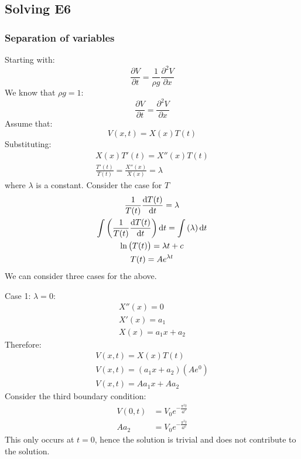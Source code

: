 \documentclass[11pt]{article}
\numberwithin{equation}{section}
\begin{document}
\subsection{Solving E6}
\subsubsection{Separation of variables}
Starting with:
\begin{equation}
    \frac{\partial V}{\partial t} = \frac{1}{\rho g }\frac{\partial^2 V}{\partial x}
\end{equation}
We know that $\rho g = 1$:
\begin{equation}
    \frac{\partial V}{\partial t} = \frac{\partial^2 V}{\partial x}
\end{equation}
Assume that:
\begin{equation}
    V(x,t) = X(x)T(t)
\end{equation}
Substituting:
\begin{gather}
    X(x)T'(t) = X''(x)T(t)\\
    \frac{T'(t)}{T(t)} = \frac{X''(x)}{X(x)} = \lambda
\end{gather}
where $\lambda$ is a constant. Consider the case for $T$
\begin{gather}
    \frac{1}{T(t)}\frac{\dif T(t)}{\dif t} = \lambda\\
    \int \left(\frac{1}{T(t)}\frac{\dif T(t)}{\dif t}\right) \dif t = \int \left(\lambda \right) \dif t\\
    \ln\left(T(t)\right) = \lambda t + c\\
    T(t) = Ae^{\lambda t}
\end{gather}
We can consider three cases for the above. 

Case 1: $\lambda = 0$:
\begin{gather}
    X''(x) = 0\\
    X'(x) = a_1\\
    X(x) = a_1 x + a_2
\end{gather}
Therefore:
\begin{gather}
    V(x,t) = X(x)T(t)\\
    V(x,t) = \left(a_1 x + a_2\right)\left(Ae^0\right)\\
    V(x,t) = A a_1 x + Aa_2 
\end{gather}
Consider the third boundary condition:
\begin{align}
    V(0,t) &= V_0 e^{-\frac{\pi^2 t}{4l^2}}\\
    Aa_2 &= V_0 e^{-\frac{\pi^2 t}{4l^2}}
\end{align}
This only occurs at $t = 0$, hence the solution is trivial and does not contribute to the solution.
\end{document}
